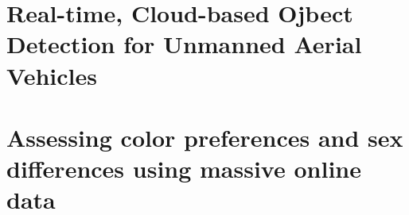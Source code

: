 \documentclass{iuphd_proposal}
\begin{document}
\chapter{Real-time, Cloud-based Ojbect Detection for Unmanned Aerial Vehicles}


\chapter{Assessing color preferences and sex differences using massive online data}


% 
% 
% 
% 
% 
% 
% 





%
\end{document}
